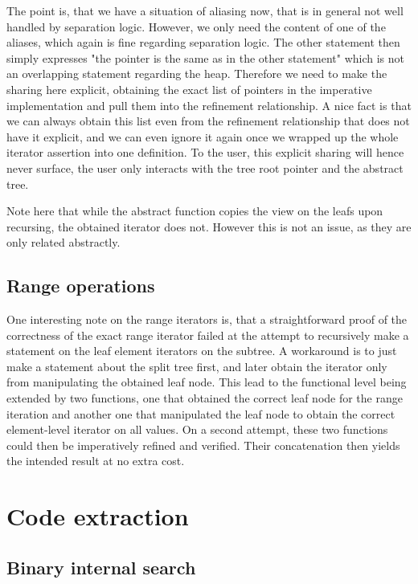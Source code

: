 \documentclass[a4paper,UKenglish,cleveref, autoref, thm-restate]{lipics-v2021}
\begin{document}
The point is, that we have a situation of aliasing now,
that is in general not well handled by separation logic.
However, we only need the content of one of the aliases, which again is fine
regarding separation logic.
The other statement then simply expresses "the pointer is the same as in the other statement"
which is not an overlapping statement regarding the heap.
Therefore we need to make the sharing here explicit,
obtaining the exact list of pointers in the imperative implementation
and pull them into the refinement relationship.
A nice fact is that we can always obtain this list even from the
refinement relationship that does not have it explicit,
and we can even ignore it again once we wrapped up the whole
iterator assertion into one definition.
To the user, this explicit sharing will hence never surface,
the user only interacts with the tree root pointer and the abstract tree.


Note here that while the abstract function copies the view on the leafs
upon recursing, the obtained iterator does not.
However this is not an issue, as they are only related abstractly.

\subsection{Range operations}
\label{sec:imperative_range}

One interesting note on the range iterators is, that a
straightforward proof of the correctness of the exact range iterator
failed at the attempt to recursively make a statement on
the leaf element iterators on the subtree.
A workaround is to just make a statement about the split tree first,
and later obtain the iterator only from manipulating the obtained leaf node.
This lead to the functional level being extended by two functions,
one that obtained the correct leaf node for the range iteration
and another one that manipulated the leaf node to obtain
the correct element-level iterator on all values.
On a second attempt, these two functions could then be imperatively
refined and verified.
Their concatenation then yields the intended result at no extra cost.

\section{Code extraction}

\subsection{Binary internal search}
\label{sec:imperative_split}
\end{document}
